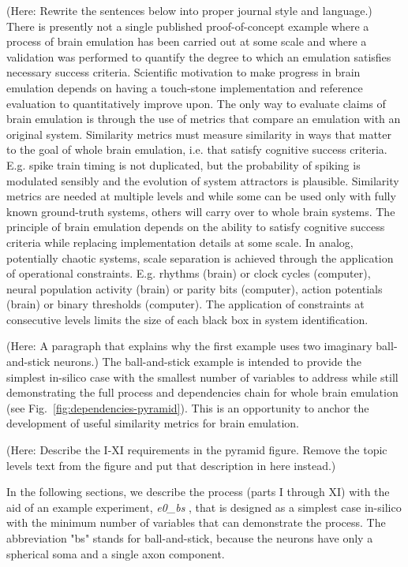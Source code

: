 \documentclass{ldr-article}
\def\firstexp{\textit{e0\_bs} }
\begin{document}
(Here: Rewrite the sentences below into proper journal style and language.)
There is presently not a single published proof-of-concept example where a process of brain emulation has been carried out at some scale and where a validation was performed to quantify the degree to which an emulation satisfies necessary success criteria. Scientific motivation to make progress in brain emulation depends on having a touch-stone implementation and reference evaluation to quantitatively improve upon. The only way to evaluate claims of brain emulation is through the use of metrics that compare an emulation with an original system. Similarity metrics must measure similarity in ways that matter to the goal of whole brain emulation, i.e. that satisfy cognitive success criteria. E.g. spike train timing is not duplicated, but the probability of spiking is modulated sensibly and the evolution of system attractors is plausible. Similarity metrics are needed at multiple levels and while some can be used only with fully known ground-truth systems, others will carry over to whole brain systems. The principle of brain emulation depends on the ability to satisfy cognitive success criteria while replacing implementation details at some scale. In analog, potentially chaotic systems, scale separation is achieved through the application of operational constraints. E.g. rhythms (brain) or clock cycles (computer), neural population activity (brain) or parity bits (computer), action potentials (brain) or binary thresholds (computer). The application of constraints at consecutive levels limits the size of each black box in system identification.

(Here: A paragraph that explains why the first example uses two imaginary ball-and-stick neurons.)
The ball-and-stick example is intended to provide the simplest in-silico case with the smallest
number of variables to address while still demonstrating the full process and dependencies
chain for whole brain emulation (see Fig.~\ref{fig:dependencies-pyramid}). This is an opportunity to anchor the development of useful similarity metrics for brain emulation.

(Here: Describe the I-XI requirements in the pyramid figure. Remove the topic levels text from the figure and put that description in here instead.)

In the following sections, we describe the process (parts I through XI) with the aid of an example experiment, \firstexp, that is designed as a simplest case in-silico with the minimum number of variables that can demonstrate the process. The abbreviation "bs" stands for ball-and-stick, because the neurons have only a spherical soma and a single axon component.
\end{document}
